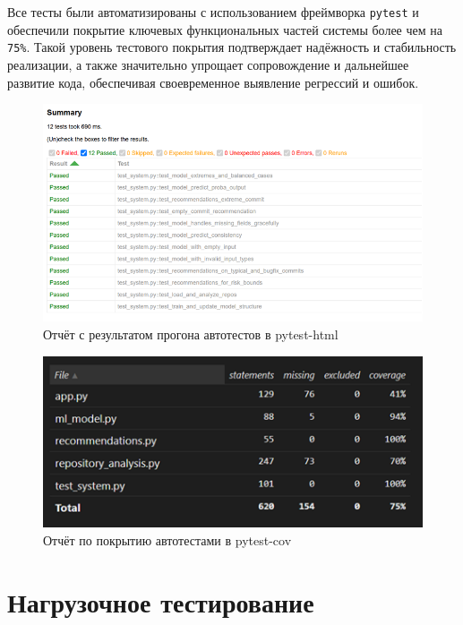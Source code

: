 Все тесты были автоматизированы с использованием фреймворка \texttt{pytest} и обеспечили покрытие ключевых функциональных частей системы более чем на \verb|75%|. Такой уровень тестового покрытия подтверждает надёжность и стабильность реализации, а также значительно упрощает сопровождение и дальнейшее развитие кода, обеспечивая своевременное выявление регрессий и ошибок.

\begin{figure}[ht]
	\centering
	\includegraphics[width=\textwidth]{my_folder/images/test_result.png}
	\caption{Отчёт с результатом прогона автотестов в pytest-html}
	\label{tab:test_pytest}
\end{figure}

\begin{figure}[ht]
	\centering
	\includegraphics[width=\textwidth]{my_folder/images/coverage.png}
	\caption{Отчёт по покрытию автотестами в pytest-cov}
	\label{tab:test_pytest2}
\end{figure}

\section{Нагрузочное тестирование}

